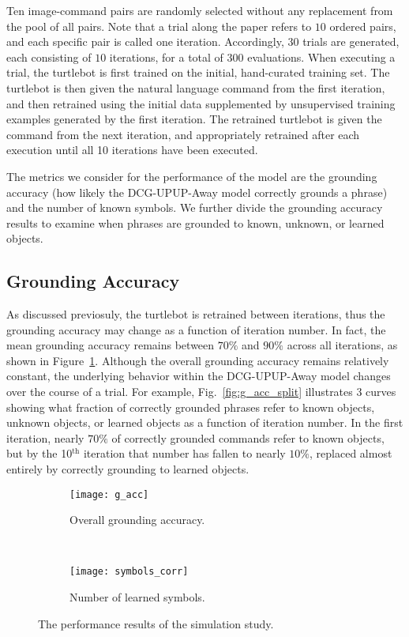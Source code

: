 Ten image-command pairs are randomly selected without any replacement from the pool of all pairs.
Note that a trial along the paper refers to $10$ ordered pairs, and each specific pair is called one iteration.
Accordingly, $30$ trials are generated, each consisting of $10$ iterations, for a total of $300$ evaluations.
When executing a trial, the turtlebot is first trained on the initial, hand-curated training set.
The turtlebot is then given the natural language command from the first iteration, and then retrained using the initial data supplemented by unsupervised training examples generated by the first iteration.
The retrained turtlebot is given the command from the next iteration, and appropriately retrained after each execution until all 10 iterations have been executed.

The metrics we consider for the performance of the model are the grounding accuracy (how likely the DCG-UPUP-Away model correctly grounds a phrase) and the number of known symbols.
We further divide the grounding accuracy results to examine when phrases are grounded to known, unknown, or learned objects.
\subsection{Grounding Accuracy}
As discussed previosuly, the turtlebot is retrained between iterations, thus the grounding accuracy may change as a function of iteration number. In fact, the mean grounding accuracy remains between $70\%$ and $90\%$ across all iterations, as shown in Figure~\ref{fig:g_acc}. Although the overall grounding accuracy remains relatively constant, the underlying behavior within the DCG-UPUP-Away model changes over the course of a trial. For example, Fig.~\ref{fig:g_acc_split} illustrates 3 curves showing what fraction of correctly grounded phrases refer to known objects, unknown objects, or learned objects as a function of iteration number. In the first iteration, nearly $70\%$ of correctly grounded commands refer to known objects, but by the 10$^\text{th}$ iteration that number has fallen to nearly $10\%$, replaced almost entirely by correctly grounding to learned objects.

\begin{figure*}[t!]
\centering
\begin{subfigure}[b]{0.8\columnwidth}
\centering
\texttt{[image: g\_acc]}
\caption{Overall grounding accuracy.}
\label{fig:g_acc}
\end{subfigure}
~~~~
\begin{subfigure}[b]{0.845\columnwidth}
\centering
\texttt{[image: symbols\_corr]}
\caption{Number of learned symbols.}
\label{fig:symbols}
\end{subfigure}
\caption{The performance results of the simulation study.}
\end{figure*}

